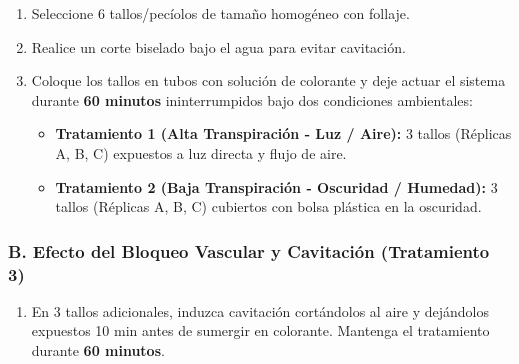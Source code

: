 \documentclass[
  spanish,
  10pt,
  letterpaper,
  twocolumn]{article}
\providecommand{\tightlist}{%
  \setlength{\itemsep}{0pt}\setlength{\parskip}{0pt}}
\begin{document}
\begin{enumerate}
\def\labelenumi{\arabic{enumi}.}
\tightlist
\item
  Seleccione 6 tallos/pecíolos de tamaño homogéneo con follaje.
\item
  Realice un corte biselado bajo el agua para evitar cavitación.
\item
  Coloque los tallos en tubos con solución de colorante y deje actuar el
  sistema durante \textbf{60 minutos} ininterrumpidos bajo dos
  condiciones ambientales:

  \begin{itemize}
  \tightlist
  \item
    \textbf{Tratamiento 1 (Alta Transpiración - Luz / Aire):} 3 tallos
    (Réplicas A, B, C) expuestos a luz directa y flujo de aire.
  \item
    \textbf{Tratamiento 2 (Baja Transpiración - Oscuridad / Humedad):} 3
    tallos (Réplicas A, B, C) cubiertos con bolsa plástica en la
    oscuridad.
  \end{itemize}
\end{enumerate}

\subsubsection{B. Efecto del Bloqueo Vascular y Cavitación (Tratamiento
3)}\label{b.-efecto-del-bloqueo-vascular-y-cavitaciuxf3n-tratamiento-3}

\begin{enumerate}
\def\labelenumi{\arabic{enumi}.}
\tightlist
\item
  En 3 tallos adicionales, induzca cavitación cortándolos al aire y
  dejándolos expuestos 10 min antes de sumergir en colorante. Mantenga
  el tratamiento durante \textbf{60 minutos}.
\end{enumerate}
\end{document}
